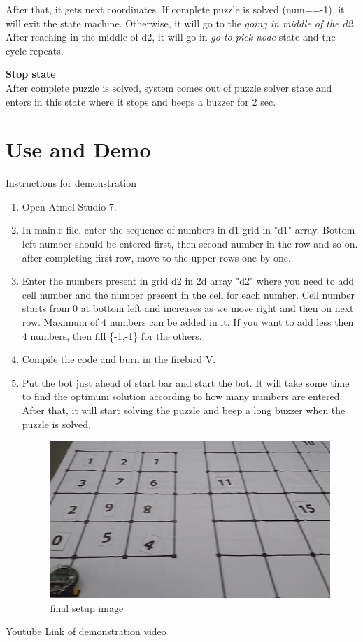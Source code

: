 \documentclass[a4paper,12pt,oneside]{book}
\begin{document}
\begin{itemize}
\begin{figure}[]
\end{figure} 
After that, it gets next coordinates. If complete puzzle is solved (num==-1), it will exit the state machine. Otherwise, it will go to the \textit{going in middle of the d2}. After reaching in the middle of d2, it will go in \textit{go to pick node} state and the cycle repeats.

\pagebreak
\end{itemize}
\textbf{Stop state}\\
After complete puzzle is solved, system comes out of puzzle solver state and enters in this state where it stops and beeps a buzzer for 2 sec.
\\
\pagebreak
\section{Use and Demo }
Instructions for demonstration

\begin{enumerate}
	\item Open Atmel Studio 7.
	\item In main.c file, enter the sequence of numbers in d1 grid in "d1" array. Bottom left number should be entered first, then second number in the row and so on. after completing first row, move to the upper rows one by one.
	\item Enter the numbers present in grid d2 in 2d array "d2" where you need to add cell number and the number present in the cell for each number. Cell number starts from 0 at bottom left and increases as we move right and then on next row. Maximum of 4 numbers can be added in it. If you want to add less then 4 numbers, then fill \{-1,-1\} for the others.
	\item Compile the code and burn in the firebird V.
	\item Put the bot just ahead of start bar and start the bot. It will take some time to find the optimum solution according to how many numbers are entered. After that, it will start solving the puzzle and beep a long buzzer when the puzzle is solved.
	\begin{figure}[h]
		\includegraphics[scale=.3]{final_setup.png}
		\caption{final setup image}
	\end{figure}
	 
\end{enumerate}
\href{https://www.youtube.com/watch?v=SvR-iOOgiqY}{Youtube Link} of demonstration video 
\end{document}
